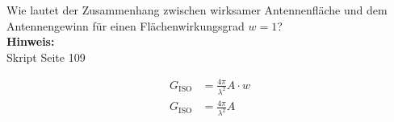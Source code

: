 \begin{question}[section=11,name={Antennenfläche \& Antennengewinn},difficulty=,quantity=8,type=thr,tags={20061016}]
	Wie lautet der Zusammenhang zwischen wirksamer Antennenfläche und dem Antennengewinn für einen Flächenwirkungsgrad $w = 1$?
	\\ \textbf{Hinweis:}\\
	Skript Seite 109
\end{question}
\begin{solution}
	\begin{align}
	G_\mathrm{ISO} &= \frac{4\pi}{\lambda^2} A \cdot w \\
	G_\mathrm{ISO} &= \frac{4\pi}{\lambda^2} A
\end{align}
\end{solution}
